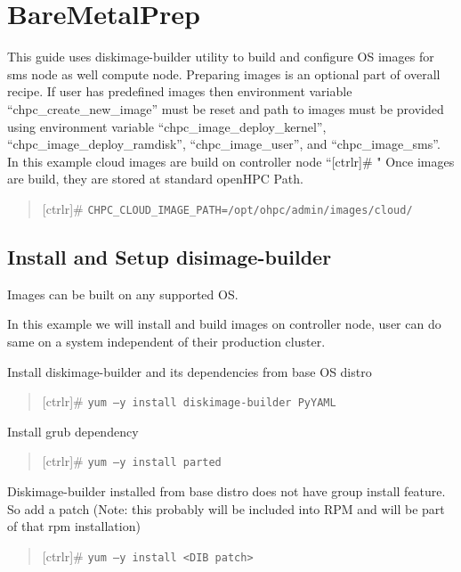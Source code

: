 \documentclass[12pt]{article}
\begin{document}
	

\newenvironment{bash}
{\begin{quote}
	}
	{ 
	\end{quote}
}
\section[]{BareMetalPrep}

This guide uses diskimage-builder utility to build and configure OS 
images for sms node as well compute node.  Preparing images is an 
optional part of overall recipe. If user has predefined images then environment 
variable “chpc\_create\_new\_image” must be reset and path to images must be 
provided using environment variable “chpc\_image\_deploy\_kernel”, 
“chpc\_image\_deploy\_ramdisk”, “chpc\_image\_user”, and “chpc\_image\_sms”. 
In this example cloud images are build on controller node “[ctrlr]\# " 
Once images are build, they are stored at standard openHPC Path.

\begin{bash}[ctrlr]\# \texttt{\small{CHPC\_CLOUD\_IMAGE\_PATH=/opt/ohpc/admin/images/cloud/}}\end{bash}

\subsection{Install and Setup disimage-builder}

Images can be built on any supported OS. 

In this example we will install and build images on controller node, user can do same on a system independent of their production cluster. 

Install diskimage-builder and its dependencies from base OS distro

\begin{bash}[ctrlr]\# \texttt{\small{yum –y install diskimage-builder PyYAML}}\end{bash}

Install grub dependency

\begin{bash}[ctrlr]\# \texttt{\small{yum –y install parted}}\end{bash}

Diskimage-builder installed from base distro does not have group install feature. So add a patch (Note: this probably will be included into RPM and will be part of that rpm installation)

\begin{bash}[ctrlr]\# \texttt{\small{yum –y install <DIB patch>}}\end{bash}
\end{document}
